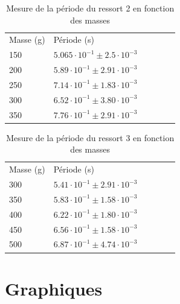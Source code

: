 \documentclass[a4paper,10pt,french]{scrartcl}
\begin{document}

\begin{table}[H]
\begin{center}
\begin{tabular}{llllll}
Masse (g) & Période (s)\\
150 &\(5.065\cdot 10^{-1}\pm 2.5\cdot 10^{-3} \)\\
200&\(5.89\cdot 10^{-1} \pm 2.91\cdot 10^{-3}\)\\
250&\(7.14\cdot 10^{-1}\pm 1.83\cdot 10^{-3}\)\\
300&\(6.52\cdot 10^{-1}\pm 3.80\cdot 10^{-3}\)\\
350& \(7.76\cdot 10^{-1}\pm 2.91\cdot 10^{-3}\)
\end{tabular}
\end{center}
\caption{Mesure de la période du ressort 2 en fonction des masses}
\end{table}

\begin{table}[H]
\begin{center}
\begin{tabular}{llllll}
Masse (g) & Période (s)\\
300 &\(5.41\cdot 10^{-1}\pm 2.91\cdot 10^{-3} \)\\
350&\(5.83\cdot 10^{-1} \pm 1.58\cdot 10^{-3}\)\\
400&\(6.22\cdot 10^{-1}\pm 1.80\cdot 10^{-3}\)\\
450&\(6.56\cdot 10^{-1}\pm 1.58\cdot 10^{-3}\)\\
500& \(6.87\cdot 10^{-1}\pm 4.74\cdot 10^{-3}\)
\end{tabular}
\end{center}
\caption{Mesure de la période du ressort 3 en fonction des masses}
\end{table}
\newpage
\section{Graphiques}
\end{document}
